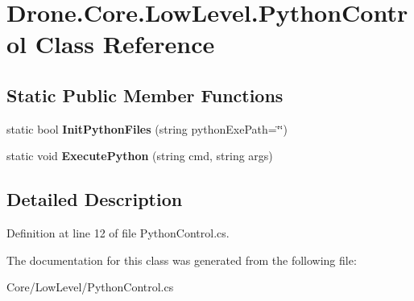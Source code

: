 \hypertarget{class_drone_1_1_core_1_1_low_level_1_1_python_control}{}\section{Drone.\+Core.\+Low\+Level.\+Python\+Control Class Reference}
\label{class_drone_1_1_core_1_1_low_level_1_1_python_control}
\subsection*{Static Public Member Functions}
\begin{DoxyCompactItemize}
\item 
\hypertarget{class_drone_1_1_core_1_1_low_level_1_1_python_control_aca9da14c8d447715263fba974dd17d37}{}static bool {\bfseries Init\+Python\+Files} (string python\+Exe\+Path=\char`\"{}\char`\"{})\label{class_drone_1_1_core_1_1_low_level_1_1_python_control_aca9da14c8d447715263fba974dd17d37}

\item 
\hypertarget{class_drone_1_1_core_1_1_low_level_1_1_python_control_ab6015f7d2c356580ec080f17282f18a1}{}static void {\bfseries Execute\+Python} (string cmd, string args)\label{class_drone_1_1_core_1_1_low_level_1_1_python_control_ab6015f7d2c356580ec080f17282f18a1}

\end{DoxyCompactItemize}


\subsection{Detailed Description}


Definition at line 12 of file Python\+Control.\+cs.



The documentation for this class was generated from the following file\+:\begin{DoxyCompactItemize}
\item 
Core/\+Low\+Level/Python\+Control.\+cs\end{DoxyCompactItemize}
